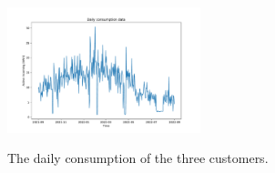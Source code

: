 \begin{figure}[H]
\begin{minipage}[b]{8.5cm}
\label{fig:dataplotdaycustomer2}
\end{minipage}
\begin{minipage}[b]{17cm}
\centering
\includegraphics[width=0.5\textwidth]{images/baseline/data_day_aggregated_plot_customer3}
\label{fig:dataplotdaycustomer3}
\end{minipage}
\caption{The daily consumption of the three customers.}
\end{figure}

